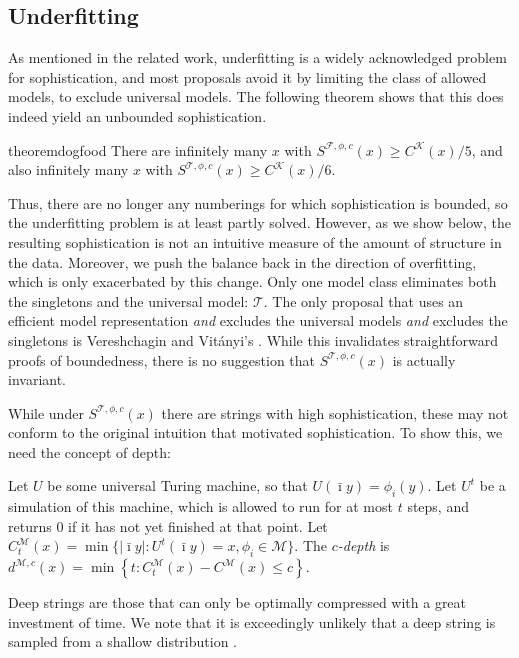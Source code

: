 \documentclass{style/llncs}
\newcommand{\M}{\mathscr M}
\newcommand{\T}{\mathscr T}
\newcommand{\F}{\mathscr F}
\newcommand{\K}{\mathscr K}
\newcommand{\s}{S}
\begin{document}
\subsection{Underfitting}

As mentioned in the related work, underfitting is a widely acknowledged problem for sophistication, and most proposals avoid it by limiting the class of allowed models, to exclude universal models. The following theorem shows that this does indeed yield an unbounded sophistication.

\begin{restatable}{theorem}{dogfood}
There are infinitely many $x$ with $\s^{\F,\phi,c}(x) \geq C^{\K}(x)/5$, and also infinitely many $x$ with $\s^{\T,\phi,c}(x) \geq C^{\K}(x)/6$.
\end{restatable} 

Thus, there are no longer any numberings for which sophistication is bounded, so the underfitting problem is at least partly solved. However, as we show below, the resulting sophistication is not an intuitive measure of the amount of structure in the data. Moreover, we push the balance back in the direction of overfitting, which is only exacerbated by this change. Only one model class eliminates both the singletons and the universal model: $\T$. The only proposal that uses an efficient model representation \emph{and} excludes the universal models \emph{and} excludes the singletons is Vereshchagin and Vit\'anyi's \cite{vitanyi2004meaningful}. While this invalidates straightforward proofs of boundedness, there is no suggestion that $S^{\T, \phi, c}(x)$ is actually invariant.

While under $S^{\T, \phi, c}(x)$ there are strings with high sophistication, these may not conform to the original intuition that motivated sophistication. To show this, we need the concept of depth:

\begin{definition}\belowdisplayskip=-12pt
Let $U$ be some universal Turing machine, so that $U(\bar\imath y) = \phi_i(y)$. Let $U^t$ be a simulation of this machine, which is allowed to run for at most $t$ steps, and returns $0$ if it has not yet finished at that point. Let $C^\M_t(x) = \min\{|\bar\imath y| : U^t(\bar\imath y) = x, \phi_i \in \M\}$. The \emph{$c$-depth} is $d^{\M,c}(x) = \min \left\{t : C^\M_t(x) - C^\M(x) \leq c \right\}$.
\end{definition}
Deep strings are those that can only be optimally compressed with a great investment of time. We note that it is exceedingly unlikely that a deep string is sampled from a shallow distribution \cite{bloem2014safe,bennett1988logical}.
 
\end{document}
